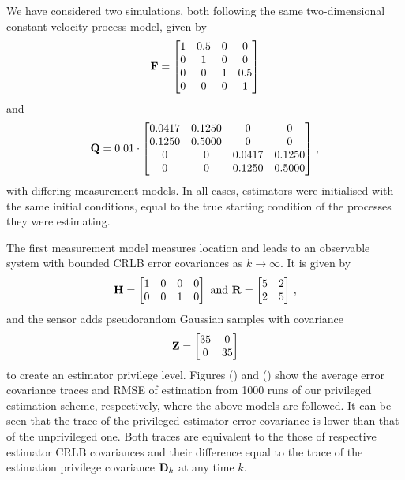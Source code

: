 \documentclass[conference]{IEEEtran}
\theoremstyle{definition}
\theoremstyle{definition}
\theoremstyle{remark}
\begin{document}
We have considered two simulations, both following the same two-dimensional constant-velocity process model, given by
\begin{equation*}
   {\ensuremath{{\mathbf{F}}}}=
   \begin{bmatrix}
      1 & 0.5 & 0 & 0\\
      0 & 1 & 0 & 0\\
      0 & 0 & 1 & 0.5\\
      0 & 0 & 0 & 1
   \end{bmatrix}
\end{equation*}
and
\begin{equation*}
   {\ensuremath{{\mathbf{Q}}}}=0.01\cdot
   \begin{bmatrix}
      0.0417 & 0.1250 & 0 & 0\\
      0.1250 & 0.5000 & 0 & 0\\
      0 & 0 & 0.0417 & 0.1250\\
      0 & 0 & 0.1250 & 0.5000
   \end{bmatrix}\,,
\end{equation*}
with differing measurement models. In all cases, estimators were initialised with the same initial conditions, equal to the true starting condition of the processes they were estimating.

The first measurement model measures location and leads to an observable system with bounded CRLB error covariances as $k \rightarrow \infty$. It is given by
\begin{equation*}
   {\ensuremath{{\mathbf{H}}}}=
   \begin{bmatrix}
      1 & 0 & 0 & 0\\
      0 & 0 & 1 & 0
   \end{bmatrix}
   \text{ and }
   {\ensuremath{{\mathbf{R}}}}=
   \begin{bmatrix}
      5 & 2\\
      2 & 5
   \end{bmatrix}\,,
\end{equation*}
and the sensor adds pseudorandom Gaussian samples with covariance
\begin{equation*}
   {\ensuremath{{\mathbf{Z}}}}=
   \begin{bmatrix}
      35 & 0\\
      0 & 35
   \end{bmatrix}
\end{equation*}
to create an estimator privilege level. Figures () and () show the average error covariance traces and RMSE of estimation from 1000 runs of our privileged estimation scheme, respectively, where the above models are followed. It can be seen that the trace of the privileged estimator error covariance is lower than that of the unprivileged one. Both traces are equivalent to the those of respective estimator CRLB covariances and their difference equal to the trace of the estimation privilege covariance ${{\mathbf{D}}}_k$ at any time $k$.
\end{document}
